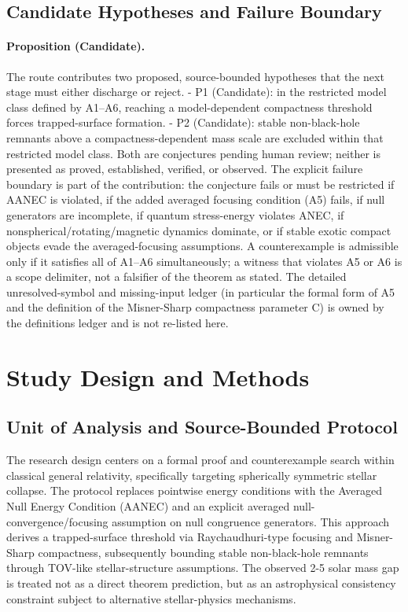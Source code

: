 \documentclass[conference]{IEEEtran}
\begin{document}
\subsection{Candidate Hypotheses and Failure Boundary}
\paragraph{Proposition (Candidate).} The route contributes two proposed, source-bounded hypotheses that the next stage must either discharge or reject. - P1 (Candidate): in the restricted model class defined by A1–A6, reaching a model-dependent compactness threshold forces trapped-surface formation. - P2 (Candidate): stable non-black-hole remnants above a compactness-dependent mass scale are excluded within that restricted model class. Both are conjectures pending human review; neither is presented as proved, established, verified, or observed. The explicit failure boundary is part of the contribution: the conjecture fails or must be restricted if AANEC is violated, if the added averaged focusing condition (A5) fails, if null generators are incomplete, if quantum stress-energy violates ANEC, if nonspherical/rotating/magnetic dynamics dominate, or if stable exotic compact objects evade the averaged-focusing assumptions. A counterexample is admissible only if it satisfies all of A1–A6 simultaneously; a witness that violates A5 or A6 is a scope delimiter, not a falsifier of the theorem as stated. The detailed unresolved-symbol and missing-input ledger (in particular the formal form of A5 and the definition of the Misner-Sharp compactness parameter C) is owned by the definitions ledger and is not re-listed here.

\section{Study Design and Methods}
\subsection{Unit of Analysis and Source-Bounded Protocol}
The research design centers on a formal proof and counterexample search within classical general relativity, specifically targeting spherically symmetric stellar collapse. The protocol replaces pointwise energy conditions with the Averaged Null Energy Condition (AANEC) and an explicit averaged null-convergence/focusing assumption on null congruence generators. This approach derives a trapped-surface threshold via Raychaudhuri-type focusing and Misner-Sharp compactness, subsequently bounding stable non-black-hole remnants through TOV-like stellar-structure assumptions. The observed 2-5 solar mass gap is treated not as a direct theorem prediction, but as an astrophysical consistency constraint subject to alternative stellar-physics mechanisms.~\cite{cite_0ed84243cf171bc4}
\end{document}
